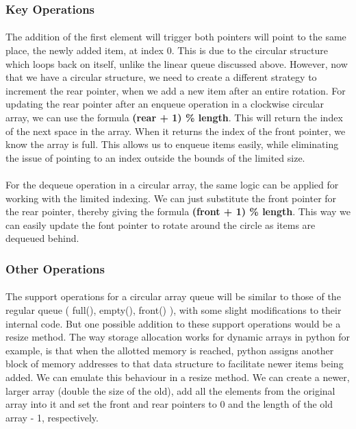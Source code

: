 \documentclass[12pt]{article}
\begin{document}
\subsubsection{ Key Operations}
\paragraph{} The addition of the first element will trigger both pointers will point to the same place, the newly added item, at index 0. This is due to the circular structure which loops back on itself, unlike the linear queue discussed above. However, now that we have a circular structure, we need to create a different strategy to increment the rear pointer, when we add a new item after an entire rotation. For updating the rear pointer after an enqueue operation in a clockwise circular array, we can use the formula \textbf{(rear + 1) \% length}. This will return the index of the next space in the array. When it returns the index of the front pointer, we know the array is full. This allows us to enqueue items easily, while eliminating the issue of pointing to an index outside the bounds of the limited size.
\paragraph{} For the dequeue operation in a circular array, the same logic can be applied for working with the limited indexing. We can just substitute the front pointer for the rear pointer, thereby giving the formula \textbf{(front + 1) \% length}. This way we can easily update the font pointer to rotate around the circle as items are dequeued behind.

\subsubsection { Other Operations}
\paragraph{} The support operations for a circular array queue will be similar to those of the regular queue ( full(), empty(), front() ), with some slight modifications to their internal code. But one possible addition to these support operations would be a resize method. The way storage allocation works for dynamic arrays in python for example, is that when the allotted memory is reached, python assigns another block of memory addresses to that data structure to facilitate newer items being added. We can emulate this behaviour in a resize method. We can create a newer, larger array (double the size of the old), add all the elements from the original array into it and set the front and rear pointers to 0 and the length of the old array - 1, respectively.
\end{document}
